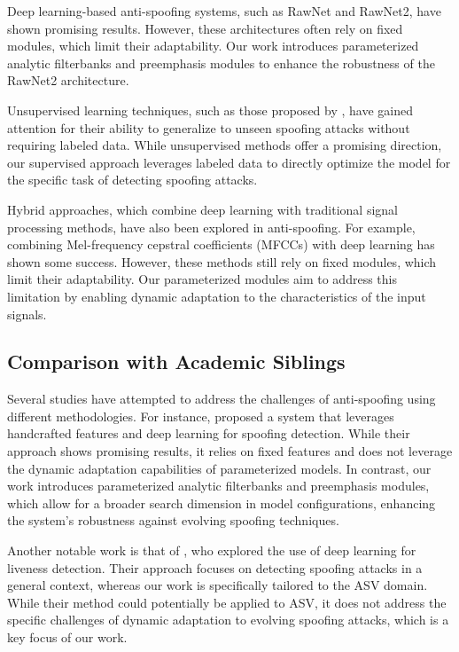 \documentclass{article} %
\begin{document}
Deep learning-based anti-spoofing systems, such as RawNet and RawNet2, have shown promising results. However, these architectures often rely on fixed modules, which limit their adaptability. Our work introduces parameterized analytic filterbanks and preemphasis modules to enhance the robustness of the RawNet2 architecture.

Unsupervised learning techniques, such as those proposed by \citet{Liu2023TowardsUD}, have gained attention for their ability to generalize to unseen spoofing attacks without requiring labeled data. While unsupervised methods offer a promising direction, our supervised approach leverages labeled data to directly optimize the model for the specific task of detecting spoofing attacks.

Hybrid approaches, which combine deep learning with traditional signal processing methods, have also been explored in anti-spoofing. For example, combining Mel-frequency cepstral coefficients (MFCCs) with deep learning has shown some success. However, these methods still rely on fixed modules, which limit their adaptability. Our parameterized modules aim to address this limitation by enabling dynamic adaptation to the characteristics of the input signals.

\subsection{Comparison with Academic Siblings}
\label{subsec:comparison}
Several studies have attempted to address the challenges of anti-spoofing using different methodologies. For instance, \citet{Feng2019SHNUAS} proposed a system that leverages handcrafted features and deep learning for spoofing detection. While their approach shows promising results, it relies on fixed features and does not leverage the dynamic adaptation capabilities of parameterized models. In contrast, our work introduces parameterized analytic filterbanks and preemphasis modules, which allow for a broader search dimension in model configurations, enhancing the system's robustness against evolving spoofing techniques.

Another notable work is that of \citet{Sabaghi2021DeepLM}, who explored the use of deep learning for liveness detection. Their approach focuses on detecting spoofing attacks in a general context, whereas our work is specifically tailored to the ASV domain. While their method could potentially be applied to ASV, it does not address the specific challenges of dynamic adaptation to evolving spoofing attacks, which is a key focus of our work.
\end{document}
